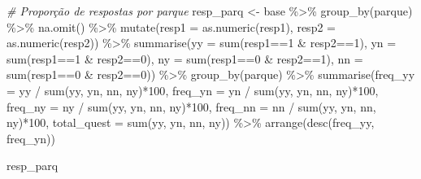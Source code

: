 \documentclass[
]{article}
\newenvironment{Shaded}{\begin{snugshade}}{\end{snugshade}}
\newcommand{\AttributeTok}[1]{\textcolor[rgb]{0.77,0.63,0.00}{#1}}
\newcommand{\CommentTok}[1]{\textcolor[rgb]{0.56,0.35,0.01}{\textit{#1}}}
\newcommand{\DecValTok}[1]{\textcolor[rgb]{0.00,0.00,0.81}{#1}}
\newcommand{\FunctionTok}[1]{\textcolor[rgb]{0.00,0.00,0.00}{#1}}
\newcommand{\NormalTok}[1]{#1}
\newcommand{\OtherTok}[1]{\textcolor[rgb]{0.56,0.35,0.01}{#1}}
\newcommand{\SpecialCharTok}[1]{\textcolor[rgb]{0.00,0.00,0.00}{#1}}
\begin{document}
\begin{Shaded}
\begin{Highlighting}[]
\CommentTok{\# Proporção de respostas por parque}
\NormalTok{resp\_parq }\OtherTok{\textless{}{-}}\NormalTok{ base }\SpecialCharTok{\%\textgreater{}\%} 
  \FunctionTok{group\_by}\NormalTok{(parque) }\SpecialCharTok{\%\textgreater{}\%} 
  \FunctionTok{na.omit}\NormalTok{() }\SpecialCharTok{\%\textgreater{}\%} 
      \FunctionTok{mutate}\NormalTok{(}\AttributeTok{resp1 =} \FunctionTok{as.numeric}\NormalTok{(resp1),}
             \AttributeTok{resp2 =} \FunctionTok{as.numeric}\NormalTok{(resp2)) }\SpecialCharTok{\%\textgreater{}\%} 
      \FunctionTok{summarise}\NormalTok{(}\AttributeTok{yy =} \FunctionTok{sum}\NormalTok{(resp1}\SpecialCharTok{==}\DecValTok{1} \SpecialCharTok{\&}\NormalTok{ resp2}\SpecialCharTok{==}\DecValTok{1}\NormalTok{),}
                \AttributeTok{yn =} \FunctionTok{sum}\NormalTok{(resp1}\SpecialCharTok{==}\DecValTok{1} \SpecialCharTok{\&}\NormalTok{ resp2}\SpecialCharTok{==}\DecValTok{0}\NormalTok{),}
                \AttributeTok{ny =} \FunctionTok{sum}\NormalTok{(resp1}\SpecialCharTok{==}\DecValTok{0} \SpecialCharTok{\&}\NormalTok{ resp2}\SpecialCharTok{==}\DecValTok{1}\NormalTok{),}
                \AttributeTok{nn =} \FunctionTok{sum}\NormalTok{(resp1}\SpecialCharTok{==}\DecValTok{0} \SpecialCharTok{\&}\NormalTok{ resp2}\SpecialCharTok{==}\DecValTok{0}\NormalTok{)) }\SpecialCharTok{\%\textgreater{}\%} 
    \FunctionTok{group\_by}\NormalTok{(parque) }\SpecialCharTok{\%\textgreater{}\%}
    \FunctionTok{summarise}\NormalTok{(}\AttributeTok{freq\_yy =}\NormalTok{ yy }\SpecialCharTok{/} \FunctionTok{sum}\NormalTok{(yy, yn, nn, ny)}\SpecialCharTok{*}\DecValTok{100}\NormalTok{,}
            \AttributeTok{freq\_yn =}\NormalTok{ yn }\SpecialCharTok{/} \FunctionTok{sum}\NormalTok{(yy, yn, nn, ny)}\SpecialCharTok{*}\DecValTok{100}\NormalTok{,}
            \AttributeTok{freq\_ny =}\NormalTok{ ny }\SpecialCharTok{/} \FunctionTok{sum}\NormalTok{(yy, yn, nn, ny)}\SpecialCharTok{*}\DecValTok{100}\NormalTok{,}
            \AttributeTok{freq\_nn =}\NormalTok{ nn }\SpecialCharTok{/} \FunctionTok{sum}\NormalTok{(yy, yn, nn, ny)}\SpecialCharTok{*}\DecValTok{100}\NormalTok{,}
            \AttributeTok{total\_quest =} \FunctionTok{sum}\NormalTok{(yy, yn, nn, ny))  }\SpecialCharTok{\%\textgreater{}\%} 
    \FunctionTok{arrange}\NormalTok{(}\FunctionTok{desc}\NormalTok{(freq\_yy, freq\_yn)) }

\NormalTok{resp\_parq}
\end{Highlighting}
\end{Shaded}
\end{document}
